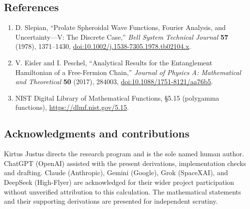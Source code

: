 \documentclass[
  10pt,
  a4paper,
]{article}
\providecommand{\tightlist}{%
  \setlength{\itemsep}{0pt}\setlength{\parskip}{0pt}}
\begin{document}
\subsection{References}\label{references}

\begin{enumerate}
\def\labelenumi{\arabic{enumi}.}
\tightlist
\item
  D. Slepian, ``Prolate Spheroidal Wave Functions, Fourier Analysis, and Uncertainty---V: The Discrete Case,'' \emph{Bell System Technical Journal} \textbf{57} (1978), 1371--1430, \url{doi:10.1002/j.1538-7305.1978.tb02104.x}.
\item
  V. Eisler and I. Peschel, ``Analytical Results for the Entanglement Hamiltonian of a Free-Fermion Chain,'' \emph{Journal of Physics A: Mathematical and Theoretical} \textbf{50} (2017), 284003, \url{doi:10.1088/1751-8121/aa76b5}.
\item
  NIST Digital Library of Mathematical Functions, §5.15 (polygamma functions), \url{https://dlmf.nist.gov/5.15}.
\end{enumerate}

\subsection{Acknowledgments and contributions}\label{acknowledgments-and-contributions}

Kirtus Justus directs the research program and is the sole named human author. ChatGPT (OpenAI) assisted with the present derivations, implementation checks and drafting. Claude (Anthropic), Gemini (Google), Grok (SpaceXAI), and DeepSeek (High-Flyer) are acknowledged for their wider project participation without unverified attribution to this calculation. The mathematical statements and their supporting derivations are presented for independent scrutiny.
\end{document}
